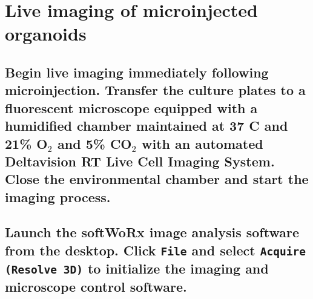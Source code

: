 \documentclass[11pt]{article}
\begin{document}
\section{{\sffamily } Live imaging of microinjected organoids}
\label{sec:orgheadline83}
\subsection{{\sffamily } Begin live imaging immediately following microinjection. Transfer the culture plates to a fluorescent microscope equipped with a humidified chamber maintained at 37 \textdegree{} C and 21\% O\(_{\text{2}}\) and 5\% CO\(_{\text{2}}\) with an automated Deltavision RT Live Cell Imaging System. Close the environmental chamber and start the imaging process.}
\label{sec:orgheadline60}

\subsection{{\sffamily } Launch the softWoRx image analysis software from the desktop. Click \texttt{File} and select \texttt{Acquire (Resolve 3D)} to initialize the imaging and microscope control software.}
\label{sec:orgheadline61}
\end{document}
